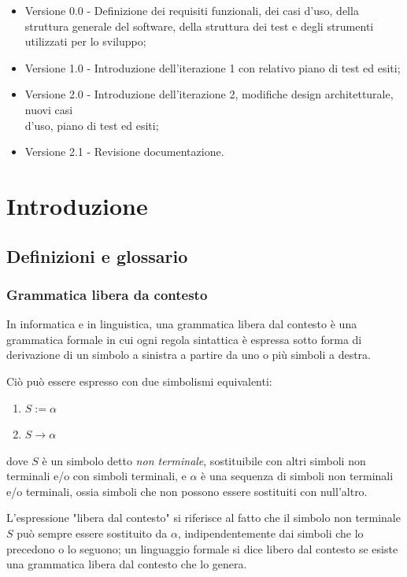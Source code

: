 \documentclass[12pt]{article}
\begin{document}
\begin{itemize}
\item Versione 0.0 - Definizione dei requisiti funzionali, dei casi d'uso, della struttura generale del software, della struttura dei test e degli strumenti utilizzati per lo sviluppo;
\item Versione 1.0 - Introduzione dell'iterazione 1 con relativo piano di test ed esiti;
\item Versione 2.0 - Introduzione dell'iterazione 2, modifiche design architetturale, nuovi casi \\d'uso, piano di test ed esiti;
\item Versione 2.1 - Revisione documentazione.
\end{itemize}


\pagebreak

\section{Introduzione}

\subsection{Definizioni e glossario}
\subsubsection*{Grammatica libera da contesto}
In informatica e in linguistica, una grammatica libera dal contesto è una grammatica formale in cui
ogni regola sintattica è espressa sotto forma di derivazione di un simbolo a sinistra a partire da uno
o più simboli a destra. \par
Ciò può essere espresso con due simbolismi equivalenti:
\begin{enumerate}[label=\arabic*)]
\item $S := \alpha$
\item $S \to \alpha$
\end{enumerate}
dove $S$ è un simbolo detto \textit{non terminale}, sostituibile con altri simboli non terminali e/o con simboli terminali, e $\alpha$ è una sequenza di simboli non terminali e/o terminali, ossia simboli che non possono essere sostituiti con null'altro. \par
L'espressione "libera dal contesto" si riferisce al fatto che il simbolo non terminale $S$ può sempre
essere sostituito da $\alpha$, indipendentemente dai simboli che lo precedono o lo seguono; un linguaggio
formale si dice libero dal contesto se esiste una grammatica libera dal contesto che lo genera.
\end{document}
